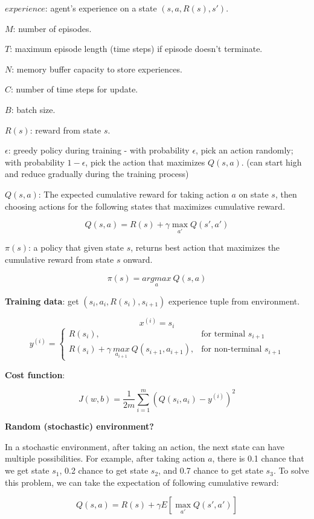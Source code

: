 \documentclass{article}
\begin{document}
\(experience\): agent's experience on a state \((s, a, R(s), s')\).

\(M\): number of episodes.

\(T\): maximum episode length (time steps) if episode doesn't terminate.

\(N\): memory buffer capacity to store experiences.

\(C\): number of time steps for update.

\(B\): batch size.

\(R(s)\): reward from state \(s\).

\(\epsilon\): greedy policy during training - with probability \(\epsilon\), pick an action randomly; with probability \(1 - \epsilon\), pick the action that maximizes \(Q(s, a)\). (can start high and reduce gradually during the training process)

\(Q(s, a)\): The expected cumulative reward for taking action \(a\) on state \(s\), then choosing actions for the following states that maximizes cumulative reward.

\[Q(s, a) = R(s) + \gamma \max_{a'} Q(s', a')\]

\(\pi(s)\): a policy that given state \(s\), returns best action that maximizes the cumulative reward from state \(s\) onward.

\[\pi(s) = \underset{a}{argmax} \ Q(s, a)\]

\textbf{Training data}: get \((s_{i}, a_{i}, R(s_{i}), s_{i+1})\) experience tuple from environment.

\[x^{(i)} = s_{i}\]
\[
y^{(i)} =
\begin{cases}
  R(s_{i}), & \text{for terminal } s_{i+1} \\
  R(s_{i}) + \gamma \ \underset{a_{i+1}}{max} \ Q(s_{i+1}, a_{i+1}), & \text{for non-terminal } s_{i+1}
\end{cases}
\]

\textbf{Cost function}:

\[J(w, b) = \frac{1}{2m} \sum_{i = 1}^m (Q(s_{i}, a_{i}) - y^{(i)})^2\]

\textbf{Random (stochastic) environment?}

In a stochastic environment, after taking an action, the next state can have multiple possibilities. For example, after taking action \(a\), there is 0.1 chance that we get state \(s_1\), 0.2 chance to get state \(s_2\), and 0.7 chance to get state \(s_3\). To solve this problem, we can take the expectation of following cumulative reward:

\[Q(s, a) = R(s) + \gamma E[\max_{a'} Q(s', a')]\]
\end{document}
